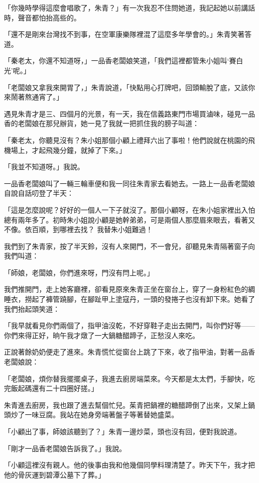 「你幾時學得這麼會唱歌了，朱青？」有一次我忍不住問她道，我記起她以前講話時，聲音都怕抬高些的。

「還不是剛來台灣找不到事，在空軍康樂隊裡混了這麼多年學會的。」朱青笑著答道。

「秦老太，你還不知道呀，」一品香老闆娘笑道，「我們這裡都管朱小姐叫‘賽白光’呢。」

「老闆娘又拿我來開胃了，」朱青說道，「快點用心打牌吧，回頭輸脫了底，又該你來鬧著熬通宵了。」

遇見朱青才是三、四個月的光景，有一天，我在信義路東門市場買滷味，碰見一品香的老闆娘在那兒辦貨，她一見了我就一把抓住我的膀子叫道：

「秦老太，你聽見沒有？朱小姐那個小顧上禮拜六出了事啦！他們說就在桃園的飛機場上，才起飛幾分鐘，就掉了下來。」

「我並不知道呀。」我說。

一品香老闆娘叫了一輛三輪車便和我一同往朱青家去看她去。一路上一品香老闆娘自說自話叨登了半天：

「這是怎麼說呢？好好的一個人一下子就沒了。那個小顧呀，在朱小姐家裡出入怕總有兩年多了。初時朱小姐說小顧是她幹弟弟，可是兩個人那麼眉來眼去，看著又不像。依百順，到哪裡去找？ 我替朱小姐難過！

我們到了朱青家，按了半天鈴，沒有人來開門，不一會兒，卻聽見朱青隔著窗子向我們叫道：

「師娘，老闆娘，你們進來呀，門沒有閂上呢。」

我們推開門，走上她客廳裡，卻看見原來朱青正坐在窗台上，穿了一身粉紅色的綢睡衣，撈起了褲管蹺腳，在腳趾甲上塗寇丹，一頭的發捲子也沒有卸下來。她看了我們抬起頭笑道：

「我早就看見你們兩個了，指甲油沒乾，不好穿鞋子走出去開門，叫你們好等——你們來得正好，晌午我才燉了一大鍋糖醋蹄子，正愁沒人來吃。

正說著餘奶奶便走了進來。朱青慌忙從窗台上跳了下來，收了指甲油，對著一品香老闆娘說：

「老闆娘，煩你替我擺擺桌子，我進去廚房端菜來。今天都是太太們，手腳快，吃完飯起碼還有二十四圈好搓。」

朱青進去廚房，我也跟了進去幫個忙兒。茱青把鍋裡的糖醋蹄倒了出來，又架上鍋頭炒了一味豆腐。我站在她身旁端著盤子等著替她盛菜。

「小顧出了事，師娘該聽到了？」朱青一邊炒菜，頭也沒有回，便對我說道。

「剛才一品香老闆娘告訴我了。」我說。

「小顧這裡沒有親人。他的後事由我和他幾個同學料理清楚了。昨天下午，我才把他的骨灰運到碧潭公墓下了葬。」

